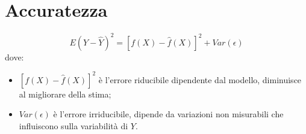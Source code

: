 \section{Accuratezza}
\[ E(Y-\hat{Y})^2 = [f(X) - \hat{f}(X)]^2 + Var(\epsilon) \]
dove:
\begin{itemize}
 \item $[f(X) - \hat{f}(X)]^2$ \`e l'errore riducibile dipendente dal 
modello, diminuisce al migliorare della stima;
 \item $Var(\epsilon)$ \`e l'errore irriducibile, dipende da variazioni non 
misurabili che influiscono sulla variabilit\`a di $Y$.
\end{itemize}
